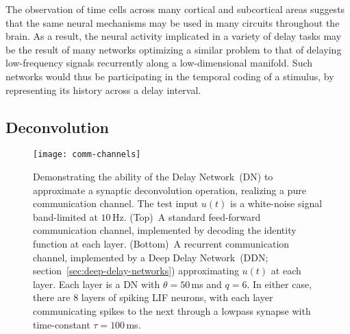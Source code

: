 The observation of time cells across many cortical and subcortical areas suggests that the same neural mechanisms may be used in many circuits throughout the brain.
As a result, the neural activity implicated in a variety of delay tasks may be the result of many networks optimizing a similar problem to that of delaying low-frequency signals recurrently along a low-dimensional manifold.
Such networks would thus be participating in the temporal coding of a stimulus, by representing its history across a delay interval.

\subsection{Deconvolution}
\label{sec:deconvolution}

\begin{figure}
    \centering
    \texttt{[image: comm-channels]}
     
    \caption{\label{fig:comm-channels} 
      Demonstrating the ability of the Delay Network~(DN) to approximate a synaptic deconvolution operation, realizing a pure communication channel.
      The test input $u(t)$ is a white-noise signal band-limited at $10$\,Hz.
      (Top)~A standard feed-forward communication channel, implemented by decoding the identity function at each layer.
      (Bottom)~A recurrent communication channel, implemented by a Deep Delay Network~(DDN; section~\ref{sec:deep-delay-networks}) approximating $u(t)$ at each layer. Each layer is a DN with $\theta = 50$\,ms and $q = 6$.
      In either case, there are $8$ layers of  spiking LIF neurons, with each layer communicating spikes to the next through a lowpass synapse with time-constant $\tau = 100$\,ms.
    }
\end{figure}


